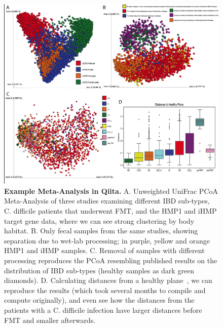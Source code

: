 \begin{figure}[htbp]
\includegraphics[width=\columnwidth]{chapter_qiita_figures/Figure_2.png}
\caption[Example Meta-Analysis in Qiita]{\textbf{Example Meta-Analysis in Qiita.} A. Unweighted UniFrac PCoA Meta-Analysis
of three studies examining different IBD sub-types, C. difficile patients that underwent
FMT, and the HMP1 and iHMP target gene data, where we can see strong clustering by body habitat.
B. Only fecal samples from the same studies, showing separation due to wet-lab processing;
in purple, yellow and orange HMP1 and iHMP samples. C. Removal of samples with different
processing reproduces the PCoA resembling published results on the distribution of IBD sub-types
(healthy samples as dark green diamonds). D. Calculating distances from a healthy
plane~\cite{Halfvarson2017}, we can reproduce the results (which took several
months to compile and compute originally), and even see how the distances from the
patients with a C. difficile infection have larger distances before FMT and smaller
afterwards.}
\label{QiitaF2}
\end{figure}

